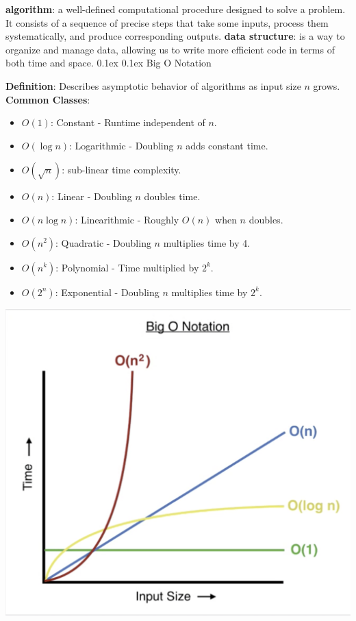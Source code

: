 \documentclass[8pt,landscape]{article}
\makeatletter
\renewcommand{\subsection}{\@startsection{subsection}{2}{0pt}%
    {0.1ex}%
    {0.1ex}%
    {\fontsize{8}{9}\bfseries\color{blue}}} %
\newcommand{\smalltext}[1]{%
  {\fontsize{8}{9}\selectfont\sloppy #1\par}%
}
\makeatother
\begin{document}
\fontsize{8}{9}\selectfont %
\pagestyle{empty}
\begin{multicols}{3}
\textbf{algorithm}: a well-defined computational procedure designed to solve a problem. It consists of a sequence of precise steps that take some inputs, process them systematically, and produce corresponding outputs. 
\textbf{data structure}: is a way to organize and manage data, allowing us to write more efficient code in terms of both time and space. 
\subsection{Big O Notation}
\smalltext{
\textbf{Definition}: Describes asymptotic behavior of algorithms as input size $n$ grows.
\textbf{Common Classes}:
\begin{itemize}[noitemsep, nolistsep, leftmargin=1em]
    \item $O(1)$: Constant - Runtime independent of $n$.
    \item $O(\log n)$: Logarithmic - Doubling $n$ adds constant time.
    \item $O(\sqrt{n})$: sub-linear time complexity.
    \item $O(n)$: Linear - Doubling $n$ doubles time.
    \item $O(n \log n)$: Linearithmic - Roughly $O(n)$ when $n$ doubles.
    \item $O(n^2)$: Quadratic - Doubling $n$ multiplies time by 4.
    \item $O(n^k)$: Polynomial - Time multiplied by $2^k$.
    \item $O(2^n)$: Exponential - Doubling $n$ multiplies time by $2^k$.
\end{itemize}
}
\includegraphics[width=0.7\linewidth]{img-1.png}

\end{multicols}
\end{document}
